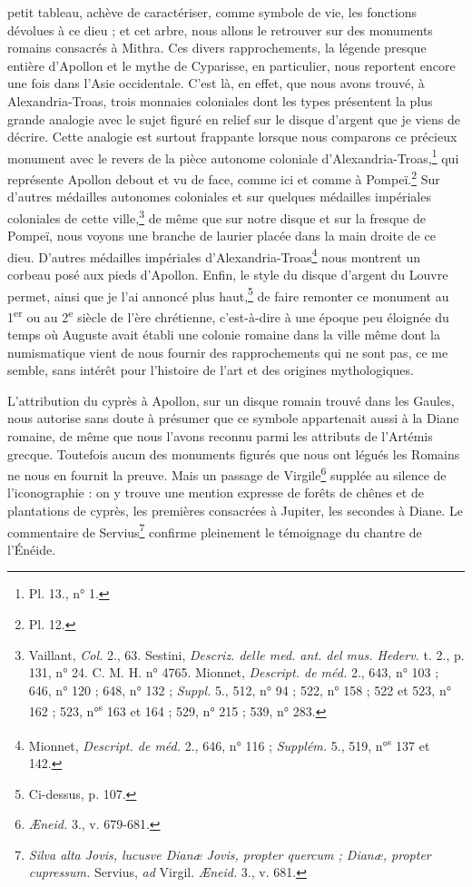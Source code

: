 \documentclass{article}
\begin{document}
petit tableau, achève de caractériser, comme symbole de vie, les fonctions dévolues à ce dieu ; et cet arbre, nous allons le retrouver sur des monuments romains consacrés à Mithra. Ces divers rapprochements, la légende presque entière d'Apollon et le mythe de Cyparisse, en particulier, nous reportent encore une fois dans l'Asie occidentale. C'est là, en effet, que nous avons trouvé, à Alexandria-Troas, trois monnaies coloniales dont les types présentent la plus grande analogie avec le sujet figuré en relief sur le disque d'argent que je viens de décrire. Cette analogie est surtout frappante lorsque nous comparons ce précieux monument avec le revers de la pièce autonome coloniale d'Alexandria-Troas,\footnote{Pl. 13., n° 1.} qui représente Apollon debout et vu de face, comme ici et comme à Pompeï.\footnote{Pl. 12.} Sur d'autres médailles autonomes coloniales et sur quelques médailles impériales coloniales de cette ville,\footnote{Vaillant, \emph{Col.} 2., 63. Sestini, \emph{Descriz. delle med. ant. del mus. Hederv.} t. 2., p. 131, n° 24. C. M. H. n° 4765. Mionnet, \emph{Descript. de méd.} 2., 643, n° 103 ; 646, n° 120 ; 648, n° 132 ; \emph{Suppl.} 5., 512, n° 94 ; 522, n° 158 ; 522 et 523, n° 162 ; 523, n°\textsuperscript{s} 163 et 164 ; 529, n° 215 ; 539, n° 283.} de même que sur notre disque et sur la fresque de Pompeï, nous voyons une branche de laurier placée dans la main droite de ce dieu. D'autres médailles impériales d'Alexandria-Troas\footnote{Mionnet, \emph{Descript. de méd.} 2., 646, n° 116 ; \emph{Supplém.} 5., 519, n°\textsuperscript{s} 137 et 142.} nous montrent un corbeau posé aux pieds d'Apollon. Enfin, le style du disque d'argent du Louvre permet, ainsi que je l'ai annoncé plus haut,\footnote{Ci-dessus, p. 107.} de faire remonter ce monument au 1\textsuperscript{er} ou au 2\textsuperscript{e} siècle de l'ère chrétienne, c'est-à-dire à une époque peu éloignée du temps où Auguste avait établi une colonie romaine dans la ville même dont la numismatique vient de nous fournir des rapprochements qui ne sont pas, ce me semble, sans intérêt pour l'histoire de l'art et des origines mythologiques.

L'attribution du cyprès à Apollon, sur un disque romain trouvé dans les Gaules, nous autorise sans doute à présumer que ce symbole appartenait aussi à la Diane romaine, de même que nous l'avons reconnu parmi les attributs de l'Artémis grecque. Toutefois aucun des monuments figurés que nous ont légués les Romains ne nous en fournit la preuve. Mais un passage de Virgile\footnote{\emph{Æneid.} 3., v. 679-681.} supplée au silence de l'iconographie : on y trouve une mention expresse de forêts de chênes et de plantations de cyprès, les premières consacrées à Jupiter, les secondes à Diane. Le commentaire de Servius\footnote{\emph{Silva alta Jovis, lucusve Dianæ Jovis, propter quercum ; Dianæ, propter cupressum.} Servius, \emph{ad} Virgil. \emph{Æneid.} 3., v. 681.} confirme pleinement le témoignage du chantre de l'Énéide.
\end{document}

